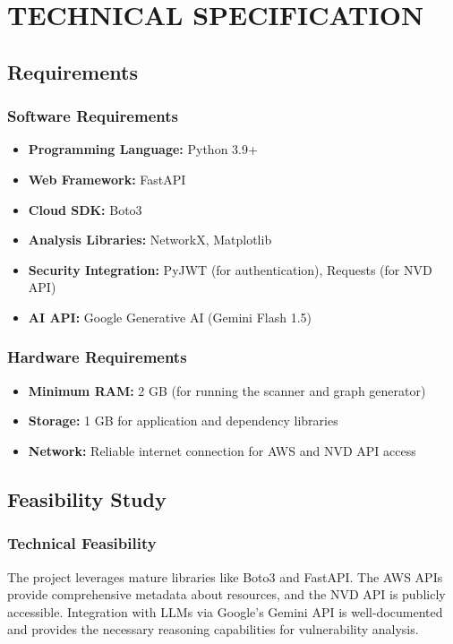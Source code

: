 \chapter{\MakeUppercase{Technical Specification}}

\section{Requirements}
\subsection{Software Requirements}
\begin{itemize}
    \item \textbf{Programming Language:} Python 3.9+
    \item \textbf{Web Framework:} FastAPI
    \item \textbf{Cloud SDK:} Boto3
    \item \textbf{Analysis Libraries:} NetworkX, Matplotlib
    \item \textbf{Security Integration:} PyJWT (for authentication), Requests (for NVD API)
    \item \textbf{AI API:} Google Generative AI (Gemini Flash 1.5)
\end{itemize}

\subsection{Hardware Requirements}
\begin{itemize}
    \item \textbf{Minimum RAM:} 2 GB (for running the scanner and graph generator)
    \item \textbf{Storage:} 1 GB for application and dependency libraries
    \item \textbf{Network:} Reliable internet connection for AWS and NVD API access
\end{itemize}

\section{Feasibility Study}
\subsection{Technical Feasibility}
The project leverages mature libraries like Boto3 and FastAPI. The AWS APIs provide comprehensive metadata about resources, and the NVD API is publicly accessible. Integration with LLMs via Google's Gemini API is well-documented and provides the necessary reasoning capabilities for vulnerability analysis.

